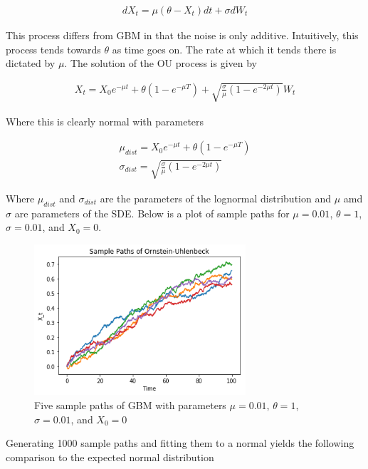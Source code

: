 \documentclass[onecolumn,notitlepage,pra,10pt,aps]{revtex4-1}
\begin{document}
  \begin{gather*}
    d X_t = \mu(\theta-X_t) dt + \sigma dW_t
  \end{gather*}

  This process differs from GBM in that the noise is only additive. Intuitively, this process tends towards $\theta$ as time goes on. The rate at which it tends there is dictated by $\mu$. The solution of the OU process is given by

  \begin{gather*}
    X_t = X_0 e^{-\mu t}+ \theta(1-e^{-\mu T}) + \sqrt{\frac{\sigma}{\mu} (1-e^{-2 \mu t})} W_t
  \end{gather*}

  Where this is clearly normal with parameters

  \begin{gather*}
    \mu_{dist} = X_0 e^{-\mu t}+ \theta(1-e^{-\mu T})  \\
    \sigma_{dist} = \sqrt{\frac{\sigma}{\mu} (1-e^{-2 \mu t})}
  \end{gather*}

  Where $\mu_{dist}$ and $\sigma_{dist}$ are the parameters of the lognormal distribution and $\mu$ amd $\sigma$ are parameters of the SDE. Below is a plot of sample paths for $\mu = 0.01$, $\theta =1$, $\sigma = 0.01$, and $X_0 = 0$.

  \begin{figure}[H]
    \centering
      \includegraphics[width=0.7\textwidth]{sample_paths_ou.png}
    \caption{Five sample paths of GBM with parameters $\mu = 0.01$, $\theta =1$, $\sigma = 0.01$, and $X_0 = 0$}
  \end{figure}

  Generating 1000 sample paths and fitting them to a normal yields the following comparison to the expected normal distribution
\end{document}
